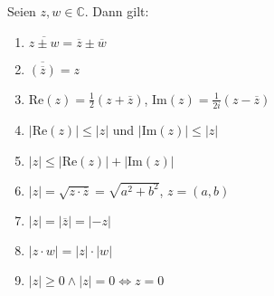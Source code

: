 Seien $z, w \in \mathbb{C}$. Dann gilt: 
\begin{enumerate}
    \item $\overline{z \pm w} = \overline{z} \pm \overline{w}$
    \item $\overline{(\overline{z})} = z$
    \item $\text{Re}(z) = \frac{1}{2}(z+\overline{z})$,
    $\text{Im}(z) = \frac{1}{2i}(z-\overline{z})$
    \item $|\text{Re}(z)| \leq |z|$ und
    $|\text{Im}(z)| \leq |z|$
    \item $|z| \leq |\text{Re}(z)| + |\text{Im}(z)|$
    \item $|z| = \sqrt{z \cdot \overline{z}} = \sqrt{a^2+b^2}$,
    $z = (a, b)$
    \item $|z| = |\overline{z}| = |-z|$
    \item $|z \cdot w| = |z| \cdot |w|$
    \item $|z| \geq 0 \land |z| = 0 \Leftrightarrow z = 0$
\end{enumerate}